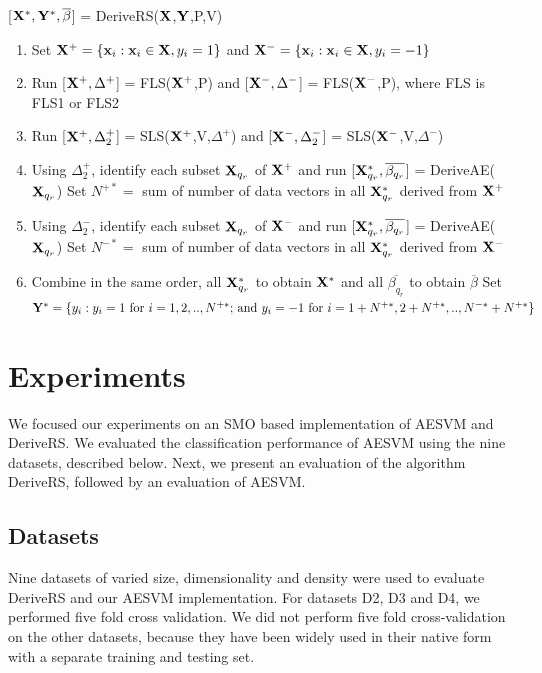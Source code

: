 \documentclass[twoside]{article}
\begin{document}
\begin{algorithm}[h]
 \renewcommand{\thealgorithm}{}
\caption{[${\bf X}^*,{\bf Y}^*,\overline{\beta}$] = DeriveRS(${\bf X}$,${\bf Y}$,P,V)}
\begin{enumerate}
  \item Set ${\bf X}^+ = \{{\bf x}_i: {\bf x}_i \in {\bf X}, y_i = 1\}$ and ${\bf X}^- = \{{\bf x}_i: {\bf x}_i \in {\bf X}, y_i = -1\}$
  \item Run [${\bf X}^+, \Delta^+$] = FLS(${\bf X}^+$,P) and [${\bf X}^-, \Delta^-$] = FLS(${\bf X}^-$,P), where FLS is FLS1 or FLS2
	\item Run [${\bf X}^+, \Delta^+ _2$] = SLS(${\bf X}^+$,V,$\Delta^+$) and [${\bf X}^-, \Delta^- _2$] = SLS(${\bf X}^-$,V,$\Delta^-$)
  \item Using $\Delta^+ _2$, identify each subset ${\bf X}_{q_r}$ of ${\bf X}^+$ and run [${\bf X}_{q_r}^*,\overline{\beta_{q_r}}$] = DeriveAE(${\bf X}_{q_r}$)
  \subitem Set $N^{+*} =$ sum of number of data vectors in all ${\bf X}_{q_r}^*$ derived from ${\bf X}^+$
  \item Using $\Delta^- _2$, identify each subset ${\bf X}_{q_r}$ of ${\bf X}^-$ and run [${\bf X}_{q_r}^*,\overline{\beta_{q_r}}$] = DeriveAE(${\bf X}_{q_r}$)
  \subitem Set $N^{-*} =$ sum of number of data vectors in all ${\bf X}_{q_r}^*$ derived from ${\bf X}^-$
  \item Combine in the same order, all ${\bf X}_{q_r}^*$ to obtain ${\bf X}^*$ and all $\overline{\beta_{q_r}}$ to obtain $\overline{\beta}$
  \subitem Set ${\bf Y}^* = \{y_i: y_i = 1 \text{ for } i = 1,2,..,N^{+*} \text{; and }y_i = -1 \text{ for } i = 1+N^{+*}, 2+N^{+*},..,N^{-*}+N^{+*}\}$
\end{enumerate}
\end{algorithm}


\section{Experiments}\label{sec:exp}
We focused our experiments on an SMO \citep{Fan05} based implementation of AESVM and DeriveRS. We evaluated the classification performance of AESVM using the nine datasets, described below. Next, we present an evaluation of the algorithm DeriveRS, followed by an evaluation of AESVM.%

\subsection{Datasets}
Nine datasets of varied size, dimensionality and density were used to evaluate DeriveRS and our AESVM implementation. For datasets D2, D3 and D4, we performed five fold cross validation. We did not perform five fold cross-validation on the other datasets, because they have been widely used in their native form with a separate training and testing set.
\end{document}
